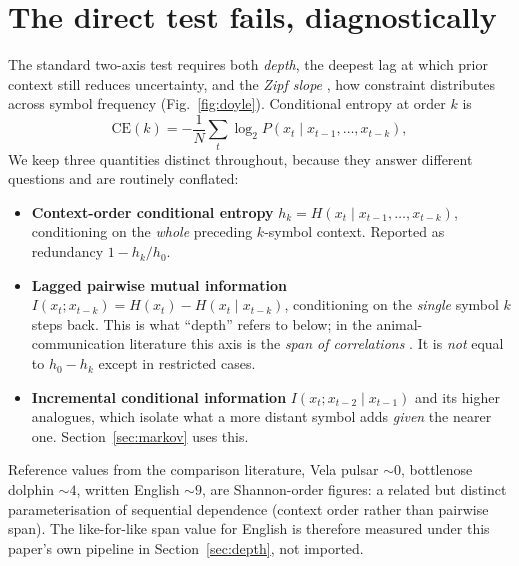 \documentclass[11pt,a4paper]{article}
\begin{document}
\section{The direct test fails, diagnostically}
\label{sec:direct}

The standard two-axis test \cite{mccowan1999,doyle2011} requires both \emph{depth}, the
deepest lag at which prior context still reduces uncertainty, and the \emph{Zipf slope}
\cite{zipf1949}, how constraint distributes across symbol frequency (Fig.~\ref{fig:doyle}). Conditional
entropy at order $k$ is
\begin{equation}
\mathrm{CE}(k) = -\frac{1}{N}\sum_t \log_2 P\!\left(x_t \mid x_{t-1},\ldots,x_{t-k}\right),
\end{equation}
We keep three quantities distinct throughout, because they answer different questions
and are routinely conflated:

\begin{itemize}[leftmargin=1.3em,itemsep=1pt]
\item \textbf{Context-order conditional entropy} $h_k = H(x_t \mid x_{t-1},\ldots,x_{t-k})$,
conditioning on the \emph{whole} preceding $k$-symbol context. Reported as redundancy
$1 - h_k/h_0$.
\item \textbf{Lagged pairwise mutual information}
$I(x_t; x_{t-k}) = H(x_t) - H(x_t \mid x_{t-k})$, conditioning on the \emph{single}
symbol $k$ steps back. This is what ``depth'' refers to below; in the
animal-communication literature this axis is the \emph{span of correlations}
\cite{ferrer2012}. It is \emph{not} equal to $h_0 - h_k$ except in restricted cases.
\item \textbf{Incremental conditional information}
$I(x_t; x_{t-2} \mid x_{t-1})$ and its higher analogues, which isolate what a more
distant symbol adds \emph{given} the nearer one. Section~\ref{sec:markov} uses this.
\end{itemize}

Reference values from the comparison literature, Vela pulsar $\sim 0$, bottlenose
dolphin $\sim 4$, written English $\sim 9$, are Shannon-order figures: a related but
distinct parameterisation of sequential dependence (context order rather than pairwise
span). The like-for-like span value for English is therefore measured under this
paper's own pipeline in Section~\ref{sec:depth}, not imported.
\end{document}
